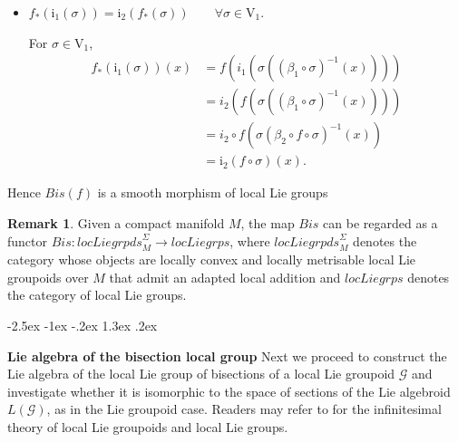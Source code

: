 \documentclass[12pt,a4paper]{amsart}
\makeatletter
\def\section{\@startsection{section}{1}{\z@}%
  {-2.5ex \@plus -1ex \@minus -.2ex}%
  {1.3ex \@plus.2ex}%
  {\normalfont\large\bfseries\raggedright}}
\theoremstyle{plain}
\theoremstyle{definition}
\newtheorem{Remark}[theorem]{Remark}
\renewenvironment{proof}[1][\proofname]{%
  \par\vspace{0.1em} %
  \pushQED{\qed}%
  \normalfont \topsep0pt \trivlist
  \item[\hskip\labelsep\itshape #1\@addpunct{.}]\ignorespaces
}{%
  \popQED\endtrivlist\@endpefalse
}
\makeatother
\begin{document}
\begin{proof}
\begin{itemize}
    For $(\sigma,\tau)\in \mathrm U_1$,
    \begin{align*}
    f_*(\mu_1(\sigma,\tau))(x)
    &=
    f(m_1(\sigma(\beta_1\circ\tau(x)),\tau(x)))\\
    &=
    m_2(f(\sigma(\beta_1\circ\tau(x))),f(\tau(x)))\\
    &=
    m_2(f(\sigma(\beta_2 \circ f (\tau(x)))), f(\tau(x)))\\
    &=
    \mu_2(f\circ\sigma,f\circ\tau)(x).
    \end{align*}

    \item $f_*(\mathrm i_1(\sigma))
    =
    \mathrm i_2(f_*(\sigma))
    \qquad
    \forall \sigma\in \mathrm V_1$.

    For $\sigma\in \mathrm V_1$,
    \begin{align*}
    f_*(\mathrm i_1(\sigma))(x)
    &=
    f(i_1(\sigma((\beta_1\circ\sigma)^{-1}(x))))\\
    &=
    i_2(f(\sigma((\beta_1\circ\sigma)^{-1}(x))))\\
    &=i_2 \circ f(\sigma(\beta_2 \circ f \circ \sigma)^{-1}(x))\\
    &=
    \mathrm i_2(f\circ\sigma)(x).
    \end{align*}
 
\end{itemize}


Hence $Bis(f)$ is a smooth morphism of local Lie groups
    
\end{proof}

\begin{Remark}
Given a compact manifold $M$, the map $Bis$ can be regarded as  a functor   $Bis : \textit{locLiegrpds}^\Sigma_M \rightarrow \textit{locLiegrps}$, where $\textit{locLiegrpds}^\Sigma_M$ denotes the category whose objects are locally convex and locally metrisable local Lie groupoids over $M$ that admit an adapted local addition and $\textit{locLiegrps}$ denotes the category of local Lie groups.
\end{Remark}
\section{\textbf{Lie algebra of the bisection local group}}
Next we proceed to construct the Lie algebra of the local Lie group of bisections of a local Lie groupoid $\mathcal{G}$ and investigate whether it is isomorphic to the space of sections of the Lie algebroid $L(\mathcal{G})$, as in the Lie groupoid case. Readers may refer to \cite{Fernandes, Neeb} for the infinitesimal theory of local Lie groupoids and local Lie groups.
\end{document}
